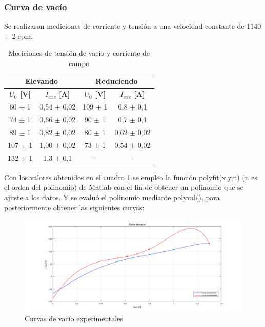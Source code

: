 \documentclass[11pt,letterpaper]{article}     %
\begin{document}
\subsubsection{Curva de vacío}
Se realizaron mediciones de corriente y tensión a una velocidad constante de 1140 $\pm$ 2 rpm.
\begin{table}[H]
	\centering
	\caption{Meciciones de tensión de vacío y corriente de campo}
	\label{MedCurvaVacio}
	\begin{tabular}{|c|c|c|c|}
		\hline
		\multicolumn{2}{|c|}{Elevando}                        & \multicolumn{2}{c|}{Reduciendo}                       \\ \hline
		\textbf{$U_{0}$ {[}V{]}} & \textbf{$I_{exc}$ {[}A{]}} & \textbf{$U_{0}$ {[}V{]}} & \textbf{$I_{exc}$ {[}A{]}} \\ \hline
		60 $\pm$ 1               & 0,54 $\pm$ 0,02            & 109 $\pm$ 1              & 0,8 $\pm$ 0,1              \\ \hline
		74 $\pm$ 1               & 0,66 $\pm$ 0,02            & 90 $\pm$ 1               & 0,7 $\pm$ 0,1              \\ \hline
		89 $\pm$ 1               & 0,82 $\pm$ 0,02            & 80 $\pm$ 1               & 0,62 $\pm$ 0,02            \\ \hline
		107 $\pm$ 1              & 1,00 $\pm$ 0,02            & 73 $\pm$ 1               & 0,54 $\pm$ 0,02            \\ \hline
		132 $\pm$ 1              & 1,3 $\pm$ 0,1              & -                        & -                          \\ \hline
	\end{tabular}
\end{table}
Con los valores obtenidos en el cuadro \ref{MedCurvaVacio} se empleo la función polyfit(x,y,n) (n es el orden del polinomio) de Matlab con el fin de obtener un polinomio que se ajuste a los datos. Y se evaluó el polinomio mediante polyval(), para posteriormente obtener las siguientes curvas:
\begin{figure}[H]
	\centering
	\includegraphics[scale=0.5]{./recursos-Lab6/curvaDeVacioExp.png}
	\caption{Curvas de vacío experimentales}
	\label{fig:curvaDeVacioExp}
\end{figure}
\end{document}
